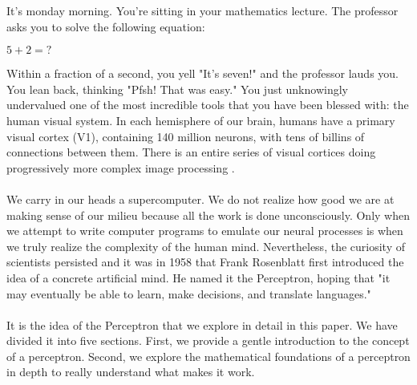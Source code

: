
It's monday morning. You're sitting in your mathematics lecture. The professor asks you to solve the following equation:
	\begin{center}
		$5 + 2 = ?$
	\end{center}
Within a fraction of a second, you yell "It's seven!" and the professor lauds you. You lean back, thinking "Pfsh! That was easy."   You just unknowingly undervalued one of the most incredible tools that you have been blessed with: the human visual system. In each hemisphere of our brain, humans have a primary visual cortex (V1), containing 140 million neurons, with tens of billins of connections between them. There is an entire series of visual cortices doing progressively more complex image processing \cite{book}. \\ \\
We carry in our heads a supercomputer. We do not realize how good we are at making sense of our milieu because all the work is done unconsciously. Only when we attempt to write computer programs to emulate our neural processes is when we truly realize the complexity of the human mind. Nevertheless, the curiosity of scientists persisted and it was in 1958 that Frank Rosenblatt first introduced the idea of a concrete artificial mind. He named it the Perceptron, hoping that "it may eventually be able to learn, make decisions, and translate languages." \\ \\
It is the idea of the Perceptron that we explore in detail in this paper. We have divided it into five sections. First, we provide a gentle introduction to the concept of a perceptron. Second, we explore the mathematical foundations of a perceptron in depth to really understand what makes it work. 

